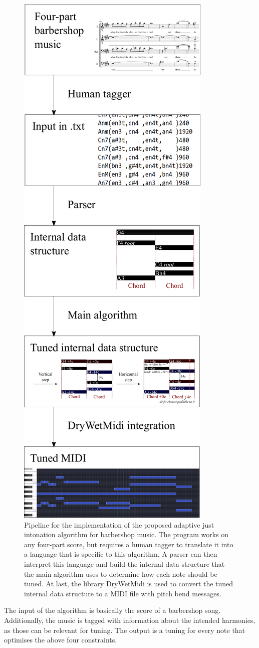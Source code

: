 \documentclass[a4paper]{article}
\begin{document}
\begin{figure}
\centering
\includegraphics[width=0.5\linewidth]{Figures/pipeline.pdf}
\caption{Pipeline for the implementation of the proposed adaptive just intonation algorithm for barbershop music. The program works on any four-part score, but requires a human tagger to translate it into a language that is specific to this algorithm. A parser can then interpret this language and build the internal data structure that the main algorithm uses to determine how each note should be tuned. At last, the library DryWetMidi is used to convert the tuned internal data structure to a MIDI file with pitch bend messages.}
\label{fig:pipeline}
\end{figure}

The input of the algorithm is basically the score of a barbershop song. Additionally, the music is tagged with information about the intended harmonies, as those can be relevant for tuning. The output is a tuning for every note that optimises the above four constraints.
\end{document}
